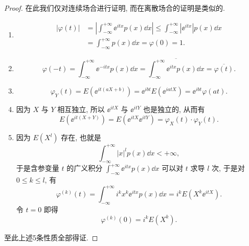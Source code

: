 \begin{proof}
    在此我们仅对连续场合进行证明,
    而在离散场合的证明是类似的.
    \begin{enumerate}
        \item 
        \begin{align*}
            \lvert \varphi (t) \rvert & = \left\lvert \int_{-\infty}^{+\infty} \ee^{itx} p (x) \dd x \right\rvert 
            \leq \int_{-\infty}^{+\infty} \left\lvert \ee^{itx} \right\rvert p (x) \dd x\\
            & = \int_{-\infty}^{+\infty} p (x) \dd x
            = \varphi (0)
            = 1.
        \end{align*}
        \item 
        \begin{equation*}
            \varphi (-t) = \int_{-\infty}^{+\infty} \ee^{-itx} p (x) \dd x
            = \overline{\int_{-\infty}^{+\infty} \ee^{itx} p (x) \dd x}
            = \overline{\varphi (t)}.
        \end{equation*}
        \item
        \begin{equation*}
            \varphi_Y (t) = E ( \ee^{it (aX + b)} )
            = \ee^{ibt} E ( \ee^{iatX} ) = \ee^{ibt} \varphi (at).
        \end{equation*}
        \item
        因为 $ X $ 与 $ Y $ 相互独立, 所以 $ \ee^{itX} $ 与 $ \ee^{itY} $ 也是独立的, 从而有
        \begin{equation*}
            E \left( \ee^{it ( X + Y )} \right) = E \left( \ee^{itX} \ee^{itY} \right) = \varphi_X (t) \cdot \varphi_Y (t).
        \end{equation*}
        \item
        因为 $ E \left( X^l \right) $ 存在, 也就是
        \begin{equation*}
            \int_{-\infty}^{+\infty} \lvert x \rvert^l p (x) \dd x < +\infty,
        \end{equation*}
        于是含参变量 $ t $ 的广义积分 $ \int_{-\infty}^{+\infty} \ee^{itx} p(x) \dd x $ 可以对 $ t $ 求导 $ l $ 次, 于是对 $ 0 \leq k \leq l $, 有
        \begin{equation*}
            \varphi ^{(k)} (t) = \int_{-\infty}^{+\infty} i^k x^k \ee^{itx} p (x) \dd x = i^k E \left( X^k \ee^{itX} \right).
        \end{equation*}
        令 $ t = 0 $ 即得
        \begin{equation*}
            \varphi^{(k)} (0) = i^k E \left( X^k \right).
        \end{equation*}
    \end{enumerate}
    至此上述5条性质全部得证.
\end{proof}

